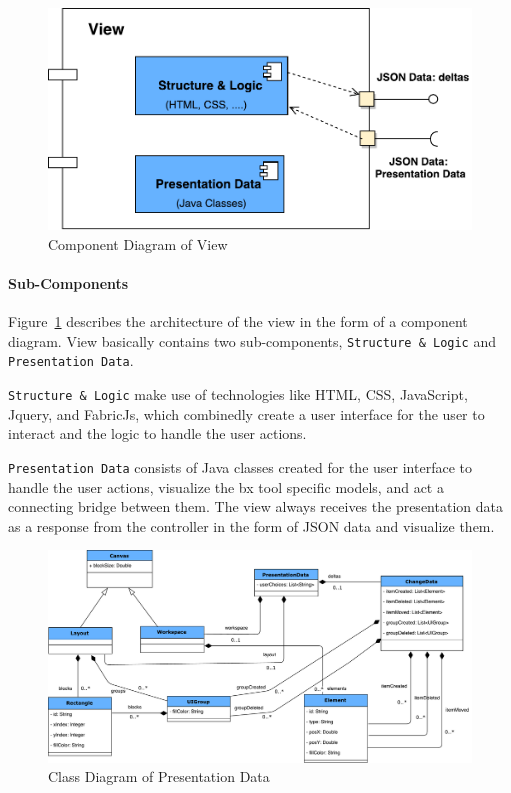 \begin{figure}[h]
	\includegraphics[width=1\textwidth]{figures/Component_Diagram-View}
	\caption{Component Diagram of View}
	\label{fig:Component_Diagram-View}
\end{figure}

\paragraph{Sub-Components}
Figure~\ref{fig:Component_Diagram-View} describes the architecture of the view in the form of a component diagram. View basically contains two sub-components, \texttt{Structure \& Logic} and \texttt{Presentation Data}. 

\texttt{Structure \& Logic} make use of technologies like HTML, CSS, JavaScript, Jquery, and FabricJs, which combinedly create a user interface for the user to interact and the logic to handle the user actions. 

\texttt{Presentation Data} consists of Java classes created for the user interface to handle the user actions, visualize the bx tool specific models, and act a connecting bridge between them.
The view always receives the presentation data as a response from the controller in the form of JSON data and visualize them.

\begin{figure}
	\includegraphics[width=1\textwidth]{figures/ClassDia_UI-Models}
	\caption{Class Diagram of Presentation Data}
	\label{fig:ClassDia_UI-Models}
\end{figure}

